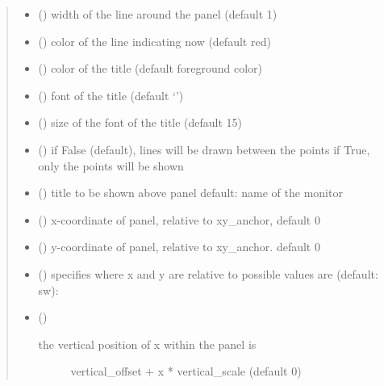 \documentclass[letterpaper,10pt,english]{sphinxmanual}
\begin{document}
\begin{fulllineitems}
\begin{fulllineitems}
\begin{quote}
\begin{description}
\begin{itemize}
\item {} 
 () \textendash{} width of the line around the panel (default 1)

\item {} 
 () \textendash{} color of the line indicating now (default red)

\item {} 
 () \textendash{} color of the title (default foreground color)

\item {} 
 ({\hyperref[\detokenize{Reference:salabim.Animate.font}]{}}) \textendash{} font of the title (default ‘’)

\item {} 
 () \textendash{} size of the font of the title (default 15)

\item {} 
 () \textendash{} if False (default), lines will be drawn between the points 
if True,  only the points will be shown

\item {} 
 () \textendash{} title to be shown above panel 
default: name of the monitor

\item {} 
 () \textendash{} x-coordinate of panel, relative to xy\_anchor, default 0

\item {} 
 () \textendash{} y-coordinate of panel, relative to xy\_anchor. default 0

\item {} 
 () \textendash{} specifies where x and y are relative to 
possible values are (default: sw): 

\item {} 
 () \textendash{} \begin{description}
\item[{the vertical position of x within the panel is}] \leavevmode
vertical\_offset + x * vertical\_scale (default 0)


\end{description}
\end{itemize}
\end{description}
\end{quote}
\end{fulllineitems}
\end{fulllineitems}
\end{document}
